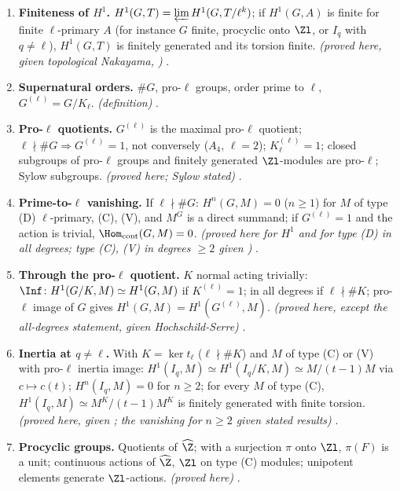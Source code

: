 \begin{enumerate}[label=\textbf{\thechapter.\arabic*}]
\item \textbf{Finiteness of $H^1$.} $H^1(G,T)=\varprojlim H^1(G,T/\ell^k)$; if $H^1(G,A)$ is finite for finite $\ell$-primary $A$ (for instance $G$ finite, procyclic onto $\Zl$, or $I_q$ with $q\ne\ell$), $H^1(G,T)$ is finitely generated and its
torsion finite. \emph{(proved here, given topological Nakayama, )} .
\item \textbf{Supernatural orders.} $\#G$, pro-$\ell$ groups, order prime to $\ell$, $G^{(\ell)}=G/K_\ell$. \emph{(definition)} .
\item \textbf{Pro-$\ell$ quotients.} $G^{(\ell)}$ is the maximal pro-$\ell$ quotient; $\ell\nmid\#G\Rightarrow G^{(\ell)}=1$, not conversely ($A_4$, $\ell=2$); $K_\ell^{(\ell)}=1$; closed subgroups of
pro-$\ell$ groups and finitely generated $\Zl$-modules are pro-$\ell$; Sylow subgroups. \emph{(proved here; Sylow stated)} .
\item \textbf{Prime-to-$\ell$ vanishing.} If $\ell\nmid\#G$: $H^n(G,M)=0$ ($n\ge1$) for $M$ of type (D) $\ell$-primary, (C), (V), and $M^G$ is a direct summand; if $G^{(\ell)}=1$ and the action is
trivial, $\Hom_{\mathrm{cont}}(G,M)=0$. \emph{(proved here for $H^1$ and for type (D) in all degrees; type (C), (V) in degrees $\ge2$ given )}
.
\item \textbf{Through the pro-$\ell$ quotient.} $K$ normal acting trivially: $\Inf\colon H^1(G/K,M)\simeq H^1(G,M)$ if $K^{(\ell)}=1$; in all degrees if $\ell\nmid\#K$; pro-$\ell$ image of $G$ gives
$H^1(G,M)=H^1(G^{(\ell)},M)$. \emph{(proved here, except the all-degrees statement, given Hochschild-Serre)} .
\item \textbf{Inertia at $q\ne\ell$.} With $K=\ker t_\ell$ ($\ell\nmid\#K$) and $M$ of type (C) or (V) with pro-$\ell$ inertia image: $H^1(I_q,M)\simeq H^1(I_q/K,M)\simeq M/(t-1)M$ via $c\mapsto c(t)$;
$H^n(I_q,M)=0$ for $n\ge2$; for every $M$ of type (C), $H^1(I_q,M)\simeq M^K/(t-1)M^K$ is finitely generated with finite torsion. \emph{(proved here, given
; the vanishing for $n\ge2$ given stated results)} .
\item \textbf{Procyclic groups.} Quotients of $\widehat\Z$; with a surjection $\pi$ onto $\Zl$, $\pi(F)$ is a unit; continuous actions of $\widehat\Z$, $\Zl$ on type (C) modules; unipotent
elements generate $\Zl$-actions. \emph{(proved here)} .

\end{enumerate}
